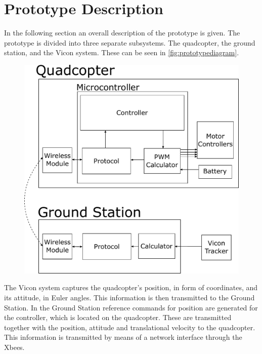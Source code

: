 \section{Prototype Description}\label{sec:PrototypeDescription}
In the following section an overall description of the prototype is given. %
The prototype is divided into three separate subsystems. The quadcopter, the ground station, and the Vicon system. These can be seen in \autoref{fig:prototypediagram}. 

\begin{figure}[H] 
	\includegraphics[scale=.5]{figures/prototypediagram}
	\centering
	\captionsetup{justification=centering}
	\label{fig:prototypediagram}
\end{figure}

The Vicon system captures the quadcopter's position, in form of coordinates, and its attitude, in Euler angles. This information is then transmitted to the Ground Station. In the Ground Station reference commands for position are generated for the controller, which is located on the quadcopter. These are transmitted together with the position, attitude and translational velocity to the quadcopter. This information is transmitted by means of a network interface through the Xbees.

